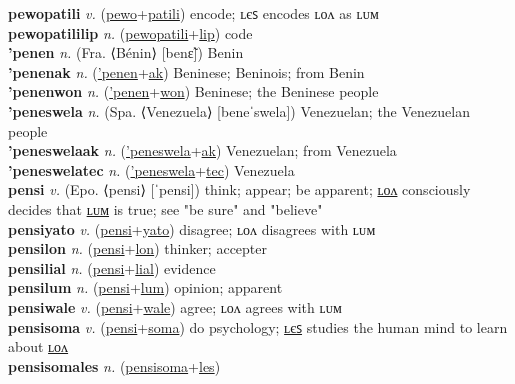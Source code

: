 \textbf{pewopatili} \textit{v.} (\hyperref[pewo]{pewo}+\hyperref[patili]{patili})
encode; ʟєꜱ encodes ʟᴏᴧ as ʟᴜᴍ \label{pewopatili} \\
\textbf{pewopatililip} \textit{n.} (\hyperref[pewopatili]{pewopatili}+\hyperref[lip]{lip})
code \label{pewopatililip} \\
\textbf{'penen} \textit{n.} (Fra. ⟨Bénin⟩ [benɛ̃])
Benin \label{'penen} \\
\textbf{'penenak} \textit{n.} (\hyperref['penen]{'penen}+\hyperref[ak]{ak})
Beninese; Beninois; from Benin \label{'penenak} \\
\textbf{'penenwon} \textit{n.} (\hyperref['penen]{'penen}+\hyperref[won]{won})
Beninese; the Beninese people \label{'penenwon} \\
\textbf{'peneswela} \textit{n.} (Spa. ⟨Venezuela⟩ [beneˈswela])
Venezuelan; the Venezuelan people \label{'peneswela} \\
\textbf{'peneswelaak} \textit{n.} (\hyperref['peneswela]{'peneswela}+\hyperref[ak]{ak})
Venezuelan; from Venezuela \label{'peneswelaak} \\
\textbf{'peneswelatec} \textit{n.} (\hyperref['peneswela]{'peneswela}+\hyperref[tec]{tec})
Venezuela \label{'peneswelatec} \\
\textbf{pensi} \textit{v.} (Epo. ⟨pensi⟩ [ˈpensi])
think; appear; be apparent; \hyperref[pensilon]{ʟᴏᴧ} consciously decides that \hyperref[pensilum]{ʟᴜᴍ} is true; see "be sure" and "believe" \label{pensi} \\
\textbf{pensiyato} \textit{v.} (\hyperref[pensi]{pensi}+\hyperref[yato]{yato})
disagree; ʟᴏᴧ disagrees with ʟᴜᴍ \label{pensiyato} \\
\textbf{pensilon} \textit{n.} (\hyperref[pensi]{pensi}+\hyperref[lon]{lon})
thinker; accepter \label{pensilon} \\
\textbf{pensilial} \textit{n.} (\hyperref[pensi]{pensi}+\hyperref[lial]{lial})
evidence \label{pensilial} \\
\textbf{pensilum} \textit{n.} (\hyperref[pensi]{pensi}+\hyperref[lum]{lum})
opinion; apparent \label{pensilum} \\
\textbf{pensiwale} \textit{v.} (\hyperref[pensi]{pensi}+\hyperref[wale]{wale})
agree; ʟᴏᴧ agrees with ʟᴜᴍ \label{pensiwale} \\
\textbf{pensisoma} \textit{v.} (\hyperref[pensi]{pensi}+\hyperref[soma]{soma})
do psychology; \hyperref[pensisomales]{ʟєꜱ} studies the human mind to learn about \hyperref[pensisomalon]{ʟᴏᴧ} \label{pensisoma} \\
\textbf{pensisomales} \textit{n.} (\hyperref[pensisoma]{pensisoma}+\hyperref[les]{les})
